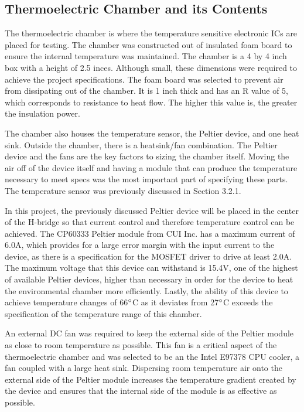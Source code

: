 \documentclass[11pt,letter]{article}
\begin{document}
\subsection{Thermoelectric Chamber and its Contents}

The thermoelectric chamber is where the temperature sensitive electronic ICs are placed for testing. The chamber was constructed out of insulated foam board to ensure the internal temperature was maintained. The chamber is a 4 by 4 inch box with a height of 2.5 inces. Although small, these dimensions were required to achieve the project specifications. The foam board was selected to prevent air from dissipating out of the chamber. It is 1 inch thick and has an R value of 5, which corresponds to resistance to heat flow. The higher this value is, the greater the insulation power.

The chamber also houses the temperature sensor, the Peltier device, and one heat sink. Outside the chamber, there is a heatsink/fan combination. The Peltier device and the fans are the key factors to sizing the chamber itself. Moving the air off of the device itself and having a module that can produce the temperature necessary to meet specs was the most important part of specifying these parts. The temperature sensor was previously discussed in Section 3.2.1.

In this project, the previously discussed Peltier device will be placed in the center of the H-bridge so that current control and therefore temperature control can be achieved. The CP60333 Peltier module from CUI Inc. has a maximum current of 6.0A, which provides for a large error margin with the input current to the device, as there is a specification for the MOSFET driver to drive at least 2.0A. The maximum voltage that this device can withstand is 15.4V, one of the highest of available Peltier devices, higher than necessary in order for the device to heat the environmental chamber more efficiently. Lastly, the ability of this device to achieve temperature changes of 66$\degree$C as it deviates from 27$\degree$C exceeds the specification of the temperature range of this chamber.

An external DC fan was required to keep the external side of the Peltier module as close to room temperature as possible. This fan is a critical aspect of the thermoelectric chamber and was selected to be an the Intel E97378 CPU cooler, a fan coupled with a large heat sink. Dispersing room temperature air onto the external side of the Peltier module increases the temperature gradient created by the device and ensures that the internal side of the module is as effective as possible.
\end{document}
